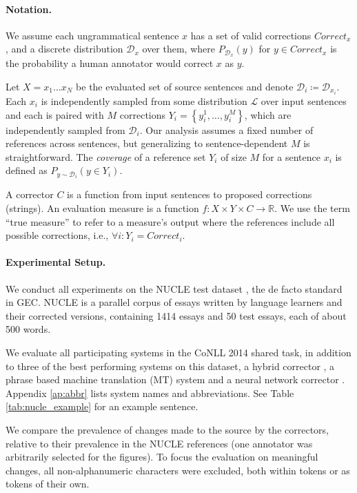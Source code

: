\documentclass[letterpaper, 11pt]{article}
\begin{document}
\paragraph{Notation.}
We assume each ungrammatical sentence $x$ has a set of valid corrections $Correct_x$,
and a discrete distribution $\mathcal{D}_x$ over them, where $P_{\mathcal{D}_x}(y)$
for $y \in Correct_x$ is the probability a human annotator would correct $x$ as $y$.

Let $X=x_{1}\ldots x_{N}$ be the evaluated set of source sentences and denote $\mathcal{D}_{i}\coloneqq \mathcal{D}_{x_i}$. Each $x_{i}$ is independently sampled from some 
distribution $\mathcal{L}$ over input sentences 
and each is paired with $M$ corrections $Y_i = \left\{y_{i}^{1},\ldots, y_{i}^{M}\right\}$,
which are independently sampled from $\mathcal{D}_{i}$. Our analysis assumes a fixed number of references across sentences, 
but generalizing to sentence-dependent $M$ is straightforward.
The {\it coverage} of a reference set $Y_i$ of size $M$ for a sentence $x_i$ is defined as $P_{y \sim \mathcal{D}_i}(y \in Y_i)$.

A corrector $C$ is a function from input sentences to proposed corrections (strings).
An evaluation measure is a function $f\colon X \times Y \times C\to \mathbb{R}$. We use the term ``true measure'' to refer to a measure's output where the references include all possible corrections, 
i.e., $\forall i\colon Y_i=Correct_i$.

\paragraph{Experimental Setup.}\label{par:experimental_setup}
We conduct all experiments on the NUCLE test dataset \cite{dahlmeier2013building},
the de facto standard in GEC.
NUCLE is a parallel corpus of essays written by language learners and their corrected versions,
containing 1414 essays and 50 test essays, each of about 500 words.

We evaluate all participating systems in the CoNLL 2014 shared task,
in addition to three of the best performing systems on this dataset,
a hybrid corrector \cite{rozovskaya2016grammatical},
a phrase based machine translation (MT) system \cite{junczysdowmunt-grundkiewicz:2016:EMNLP2016} 
and a neural network corrector \cite{xie2016neural}.
Appendix \ref{ap:abbr} lists system names and abbreviations.
See Table \ref{tab:nucle_example} for an example sentence.

We compare the prevalence of changes made to the source by the correctors,
relative to their prevalence in the NUCLE references (one annotator was arbitrarily 
selected for the figures). 
To focus the evaluation on meaningful changes, all non-alphanumeric characters were 
excluded, both within tokens or as tokens of their own.
\end{document}
